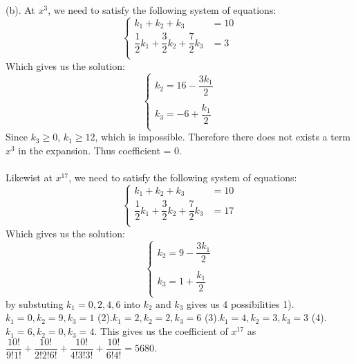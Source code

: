 \documentclass{article}
\begin{document}
\noindent (b). At $x^3$, we need to satisfy the following system of equations:
$$\begin{cases}
		k_1 + k_2 + k_3 &= 10\\
		\dfrac{1}{2}k_1 + \dfrac{3}{2}k_2 + \dfrac{7}{2} k_3 &= 3\\
\end{cases}$$
\indent Which gives us the solution:
$$\begin{cases}
	k_2 = 16 - \dfrac{3k_1}{2}\\\\
	k_3 = -6 + \dfrac{k_1}{2}\\
\end{cases}$$
\indent Since $k_3 \geq 0$, $k_1 \geq 12$, which is impossible. Therefore there does not exists a term $x^3$ in the expansion. Thus coefficient = 0.\\\\
Likewist at $x^17$, we need to satisfy the following system of equations:
$$\begin{cases}
	k_1 + k_2 + k_3 &= 10\\
	\dfrac{1}{2}k_1 + \dfrac{3}{2}k_2 + \dfrac{7}{2} k_3 &= 17\\
\end{cases}$$
\indent Which gives us the solution:
$$\begin{cases}
	k_2 = 9 - \dfrac{3k_1}{2}\\\\
	k_3 = 1 + \dfrac{k_1}{2}\\
\end{cases}$$
\indent by substuting $k_1 = 0,2,4,6$ into $k_2 \text{ and } k_3$ gives us 4 possibilities 1).$k_1 = 0, k_2 = 9, k_3 = 1 $ (2).$k_1 = 2, k_2 = 2, k_3 = 6$ (3).$k_1 = 4, k_2 = 3, k_3 = 3$ (4).$k_1 = 6, k_2 = 0, k_3 = 4$. This gives us the coefficient of $x^{17}$ as $\dfrac{10!}{9!1!}+\dfrac{10!}{2!2!6!}+\dfrac{10!}{4!3!3!}+\dfrac{10!}{6!4!} = 5680$.
\clearpage
\end{document}
